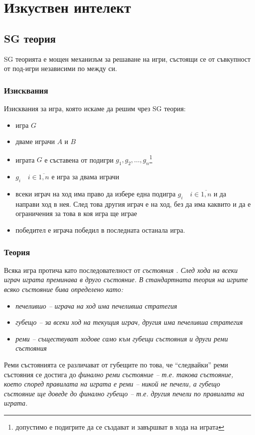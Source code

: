 \documentclass[a4paper]{article}
\begin{document}
\section{Изкуствен интелект}
  \subsection{SG теория}
  SG теорията е мощен механизъм за решаване на игри, състоящи се от съвкупност
  от под-игри независими по между си.
  
    \subsubsection{Изисквания}
    Изисквания за игра, която искаме да решим чрез SG теория:
    \begin{itemize}
      \item игра $G$
      \item дваме играчи $A$ и $B$
      \item играта $G$ е съставена от подигри $g_1, g_2, \dots,
      g_n$\footnote{допустимо е подигрите да се създават и завършват в хода на
      играта}
      \item $g_i \quad i \in \overline{1,n}$  е игра за двама играчи
      \item всеки играч на ход има право да избере една подигра $g_i \quad i \in
      \overline{1,n}$ и да направи ход в нея. След това другия играч е на ход,
      без да има каквито и да е ограничения за това в коя игра ще играе
      \item победител е играча победил в последната останала игра.
    \end{itemize}
  
    \subsubsection{Теория}
    Всяка игра протича като последователност от \em състояния \em. След хода на
    всеки играч играта преминава в друго състояние. В стандартната теория на
    игрите всяко състояние бива определено като:
    \begin{itemize}
      \item \em печелившо \em -- играча на ход има печеливша стратегия
      \item \em губещо \em -- за всеки ход на текущия играч, другия има
      печеливша стратегия
      \item \em реми \em -- съществуват ходове само към губещи състояния
      и други реми състояния
    \end{itemize}
    Реми състоянията се различават от губещите по това, че ``следвайки'' реми
    състояния се достига до \em финално \em реми състояние -- т.е. такова
    състояние, което според правилата на играта е реми -- никой не печели,
    а губещо състояние ще доведе до финално губещо -- т.е. другия печели по
    правилата на играта.
\end{document}
